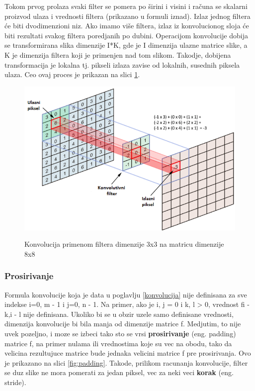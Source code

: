 \documentclass[a4paper]{article}
\begin{document}
Tokom prvog prolaza svaki filter se pomera po širini i visini i računa se skalarni proizvod ulaza i vrednosti filtera (prikazano u formuli iznad). Izlaz jednog filtera će biti dvodimenzioni niz. Ako imamo više filtera, izlaz iz konvolucionog sloja će biti rezultati svakog filtera poredjanih po dubini. Operacijom konvolucije dobija se transformirana slika dimenzije I*K, gde je I dimenzija ulazne matrice slike, a K je dimenzija filtera koji je primenjen nad tom slikom. Takodje, dobijena transformacija je lokalna tj. pikseli izlaza zavise od lokalnih, susednih piksela ulaza. Ceo ovaj proces je prikazan na slici \ref{fig:convolution}.



\begin{figure}[h!]
\caption{Konvolucija primenom filtera dimenzije 3x3 na matricu dimenzije 8x8}
\centering
\includegraphics[scale=0.9]{convolution.png}
\label{fig:convolution}
\end{figure}

\subsubsection{Prosirivanje}

Formula konvolucije koja je data u poglavlju \ref{konvolucija} nije definisana za sve indekse i=0, m - 1 i j=0, n - 1. Na primer, ako je i, j = 0 i k, l > 0, vrednost fi - k,i - l nije definisana. Ukoliko bi se u obzir uzele samo definisane vrednosti, dimenzija konvolucije bi bila manja od dimenzije matrice f. Medjutim, to nije uvek pozeljno, i moze se izbeci tako sto se vrsi \textbf{prosirivanje} (eng. padding) matrice f, na primer nulama ili vrednostima koje su vec na obodu, tako da velicina rezultujuce matrice bude jednaka velicini matrice f pre prosirivanja. Ovo je prikazano na slici \ref{fig:padding}. Takode, prilikom racunanja konvolucije, filter se duz slike ne mora pomerati za jedan piksel, vec za neki veci \textbf{ korak} (eng. stride).
\end{document}
